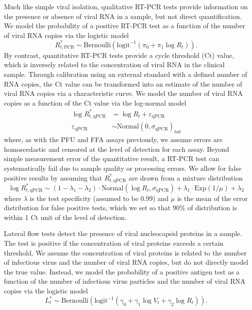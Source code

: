 \documentclass[12pt]{article}
\begin{document}
Much like simple viral isolation, qualitative RT-PCR tests provide information on the presence or absence of viral RNA in a sample, but not direct quantification. We model the probability of a positive RT-PCR test as a function of the number of viral RNA copies via the logistic model
\begin{equation*}
    R^{*}_{t,\text{PCR}} \sim \text{Bernoulli}(\text{logit}^{-1}(\pi_0 + \pi_1 \log R_t)).
\end{equation*}
By contrast, quantitative RT-PCR tests provide a cycle threshold (Ct) value, which is inversely related to the concentration of viral RNA in the clinical sample. Through calibration using an external standard with a defined number of RNA copies, the Ct value can be transformed into an estimate of the number of viral RNA copies via a characteristic curve. We model the number of viral RNA copies as a function of the Ct value via the log-normal model
\begin{align*}
    \log R^{*}_{t,\text{qPCR}} &= \log R_t + \varepsilon_{\text{qPCR}} \\
    \varepsilon_{\text{qPCR}} &\sim \text{Normal}(0, \sigma_{\text{qPCR}})_{lod}
\end{align*}
where, as with the PFU and FFA assays previously, we assume errors are homoscedastic and censored at the level of detection for each assay. Beyond simple measurement error of the quantitative result, a RT-PCR test can systematically fail due to sample quality or processing errors. We allow for false positive results by assuming that $R^{*}_{t,\text{qPCR}}$ are drawn from a mixture distribution
\begin{equation*}
    \log R^{*}_{t,\text{qPCR}} \sim (1 - \lambda_1 - \lambda_2) \cdot \text{Normal}(\log R_t, \sigma_{\text{qPCR}}) + \lambda_1 \cdot \text{Exp}(1/\mu) + \lambda_2 
\end{equation*}
where $\lambda$ is the test specificity (assumed to be 0.99) and $\mu$ is the mean of the error distribution for false positive tests, which we set so that 90\% of distribution is within 1 Ct unit of the level of detection.

Lateral flow tests detect the presence of viral nucleocapsid proteins in a sample. The test is positive if the concentration of viral proteins exceeds a certain threshold. We assume the concentration of viral proteins is related to the number of infectious virus and the number of viral RNA copies, but do not directly model the true value. Instead, we model the probability of a positive antigen test as a function of the number of infectious virus particles and the number of viral RNA copies via the logistic model
\begin{equation*}
    L_t^* \sim \text{Bernoulli}(\text{logit}^{-1}(\gamma_0 + \gamma_1 \log V_t + \gamma_2 \log R_t)).
\end{equation*}
\end{document}
